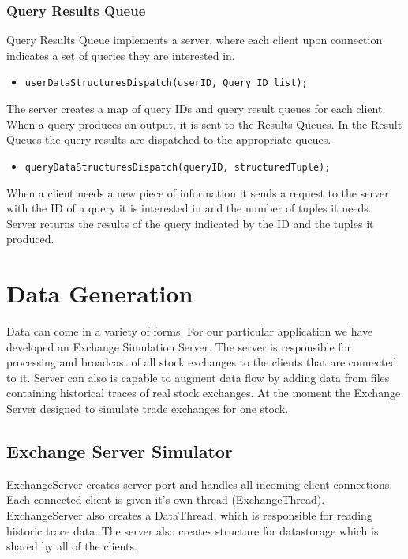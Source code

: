 \documentclass[11pt]{article}
\begin{document}
\subsubsection{Query Results Queue}

Query Results Queue implements a server, where each client upon connection indicates a set of queries they are interested in.

\begin{itemize}
	\item {\tt userDataStructuresDispatch(userID, Query ID list);}
\end{itemize}

\noindent The server creates a map of query IDs and query result queues for each client. When a query produces an output, it is sent to the Results Queues. In the Result Queues the query results are dispatched to the appropriate queues.

\begin{itemize}
	\item {\tt queryDataStructuresDispatch(queryID, structuredTuple);}
\end{itemize}

\noindent When a client needs a new piece of information it sends a request to the server with the ID of a query it is interested in and the number of tuples it needs. Server returns the results of the query indicated by the ID and the tuples it produced. 

\section{Data Generation}

Data can come in a variety of forms. For our particular application we have developed an Exchange Simulation Server. The server is responsible for processing and broadcast of all stock exchanges to the clients that are connected to it. Server can also is capable to augment data flow by adding data from files containing historical traces of real stock exchanges. At the moment the Exchange Server designed to simulate trade exchanges for one stock.   

\subsection{Exchange Server Simulator}
ExchangeServer creates server port and handles all incoming client connections. Each connected client is given it's own thread (ExchangeThread). ExchangeServer also creates a DataThread, which is responsible for reading historic trace data. The server also creates structure for datastorage which is shared by all of the clients.
\end{document}
